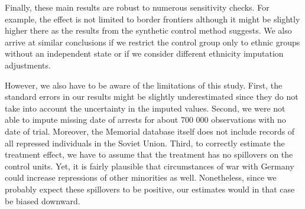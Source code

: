  

Finally, these main results are robust to numerous sensitivity checks. For example, the effect is not limited to border frontiers although it might be slightly higher there as the results from the synthetic control method suggests. We also arrive at similar conclusions if we restrict the control group only to ethnic groups without an independent state or if we consider different ethnicity imputation adjustments. 


However, we also  have to be aware of the limitations of this study. 
First, the standard errors in our results might be slightly underestimated  since they do not take into account the uncertainty in the imputed values. 
Second, we were not able to impute missing date of arrests for about 700 000 observations with no date of trial. Moreover, the Memorial database itself does not include records of all repressed individuals in the Soviet Union.  
Third, to correctly estimate the treatment effect, we have to assume that the treatment has no spillovers on the control units. Yet, it is fairly plausible that circumstances of war with Germany could increase repressions of other minorities as well.
Nonetheless, since we probably expect these spillovers  to be positive, our estimates would in that case be biased downward.

